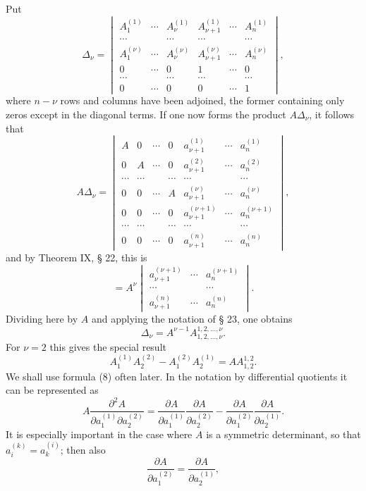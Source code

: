 
Put
\[
\Delta_\nu=\begin{vmatrix}
 A_1^{(1)}&\cdots&A_\nu^{(1)}&A_{\nu+1}^{(1)}&\cdots&A_n^{(1)}\\
 \cdots&&\cdots&\cdots&&\cdots\\
 A_1^{(\nu)}&\cdots&A_\nu^{(\nu)}&A_{\nu+1}^{(\nu)}&\cdots&A_n^{(\nu)}\\
 0&\cdots&0&1&\cdots&0\\
 \cdots&&\cdots&\cdots&&\cdots\\
 0&\cdots&0&0&\cdots&1
\end{vmatrix},\tag{5}
\]
where $n-\nu$ rows and columns have been adjoined, the former containing only zeros except in the diagonal terms. If one now forms the product $A\Delta_\nu$, it follows that
\begin{equation}
A\Delta_\nu=
\begin{vmatrix}
 A&0&\cdots&0&a_{\nu+1}^{(1)}&\cdots&a_n^{(1)}\\
 0&A&\cdots&0&a_{\nu+1}^{(2)}&\cdots&a_n^{(2)}\\
 \cdots&\cdots&&\cdots&\cdots&&\cdots\\
 0&0&\cdots&A&a_{\nu+1}^{(\nu)}&\cdots&a_n^{(\nu)}\\
 0&0&\cdots&0&a_{\nu+1}^{(\nu+1)}&\cdots&a_n^{(\nu+1)}\\
 \cdots&\cdots&&\cdots&\cdots&&\cdots\\
 0&0&\cdots&0&a_{\nu+1}^{(n)}&\cdots&a_n^{(n)}
\end{vmatrix},\tag{6}
\end{equation}
and by Theorem IX, § 22, this is
\[
= A^\nu
 \begin{vmatrix}
 a_{\nu+1}^{(\nu+1)}&\cdots&a_n^{(\nu+1)}\\
 \cdots&&\cdots\\
 a_{\nu+1}^{(n)}&\cdots&a_n^{(n)}
 \end{vmatrix}.
\]
Dividing here by $A$ and applying the notation of § 23, one obtains
\begin{equation}
 \Delta_\nu=A^{\nu-1}A_{1,2,\ldots,\nu}^{1,2,\ldots,\nu}.\tag{7}
\end{equation}
For $\nu=2$ this gives the special result
\begin{equation}
 A_1^{(1)}A_2^{(2)}-A_1^{(2)}A_2^{(1)}=A A_{1,2}^{1,2}.\tag{8}
\end{equation}
We shall use formula (8) often later. In the notation by differential quotients it can be represented as
\begin{equation}
 A\frac{\partial^2A}{\partial a_1^{(1)}\partial a_2^{(2)}}
 =\frac{\partial A}{\partial a_1^{(1)}}\frac{\partial A}{\partial a_2^{(2)}}
 -\frac{\partial A}{\partial a_1^{(2)}}\frac{\partial A}{\partial a_2^{(1)}}.\tag{9}
\end{equation}
It is especially important in the case where $A$ is a symmetric determinant, so that $a_i^{(k)}=a_k^{(i)}$; then also
\[
 \frac{\partial A}{\partial a_1^{(2)}}=\frac{\partial A}{\partial a_2^{(1)}},
\]
